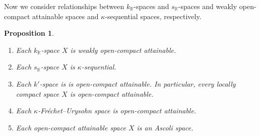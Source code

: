 \documentclass[preprint,11pt]{elsarticle}
\newtheorem{proposition}[theorem]{Proposition}
\numberwithin{equation}{section}
\numberwithin{theorem}{section}
\newcommand{\IR}{\mathbb{R}}
\newcommand{\SM}{{\setminus}}
\begin{document}



Now we consider relationships between $k_\IR$-spaces and $s_\IR$-spaces and weakly open-compact attainable spaces and  $\kappa$-sequential spaces, respectively.


\begin{proposition} \label{p:wOCA-k-space}
\begin{enumerate}
\item[{\rm(i)}] Each $k_\IR$-space $X$ is weakly open-compact attainable.
\item[{\rm(ii)}] Each $s_\IR$-space $X$ is $\kappa$-sequential.
\item[{\rm(iii)}] Each $k'$-space is is open-compact  attainable. In particular, every locally compact space $X$ is open-compact attainable. %
\item[{\rm(iv)}] Each $\kappa$-Fr\'{e}chet--Urysohn space is open-compact attainable.
\item[{\rm(v)}] Each open-compact attainable space $X$ is an Ascoli space.
\end{enumerate}
\end{proposition}
\end{document}
